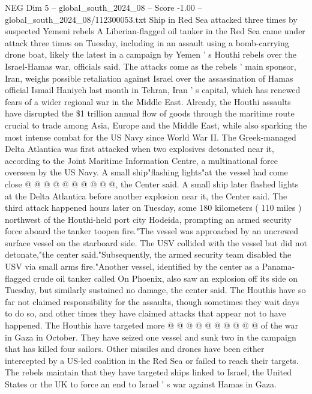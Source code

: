 \begin{textsample}{NEG Dim 5 – global\_south\_2024\_08 – Score -1.00 – global\_south\_2024\_08/112300053.txt}  \label{ex:f5_neg_172}
Ship in Red Sea attacked three times by suspected Yemeni rebels A Liberian-flagged oil tanker in the Red Sea came under attack three times on Tuesday, including in an assault using a bomb-carrying drone boat, likely the latest in a campaign by Yemen ' s Houthi rebels over the Israel-Hamas war, officials said.
The attacks come as the rebels ' main sponsor, Iran, weighs possible retaliation against Israel over the assassination of Hamas official Ismail Haniyeh last month in Tehran, Iran ' s capital, which has renewed fears of a wider regional war in the Middle East.
Already, the Houthi assaults have disrupted the \$1 trillion annual flow of goods through the maritime route crucial to trade among Asia, Europe and the Middle East, while also sparking the most intense combat for the US Navy since World War II.
The Greek-managed Delta Atlantica was first attacked when two explosives detonated near it, according to the Joint Maritime Information Centre, a multinational force overseen by the US Navy.
A small ship"flashing lights"at the vessel had come close @ @ @ @ @ @ @ @ @ @, the Center said.
A small ship later flashed lights at the Delta Atlantica before another explosion near it, the Center said.
The third attack happened hours later on Tuesday, some 180 kilometers ( 110 miles ) northwest of the Houthi-held port city Hodeida, prompting an armed security force aboard the tanker toopen fire."The vessel was approached by an uncrewed surface vessel on the starboard side.
The USV collided with the vessel but did not detonate,"the center said."Subsequently, the armed security team disabled the USV via small arms fire."Another vessel, identified by the center as a Panama-flagged crude oil tanker called On Phoenix, also saw an explosion off its side on Tuesday, but similarly sustained no damage, the center said.
The Houthis have so far not claimed responsibility for the assaults, though sometimes they wait days to do so, and other times they have claimed attacks that appear not to have happened.
The Houthis have targeted more @ @ @ @ @ @ @ @ @ @ of the war in Gaza in October.
They have seized one vessel and sunk two in the campaign that has killed four sailors.
Other missiles and drones have been either intercepted by a US-led coalition in the Red Sea or failed to reach their targets.
The rebels maintain that they have targeted ships linked to Israel, the United States or the UK to force an end to Israel ' s war against Hamas in Gaza.

\end{textsample}
